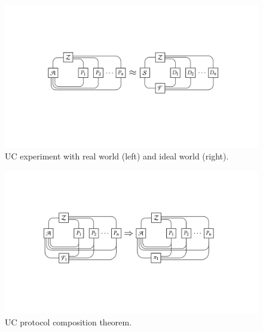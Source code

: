 \begin{figure}
  \centering
  \includegraphics[width=\linewidth]{graphics/uc-experiment}
  \caption{UC experiment with real world (left) and ideal world (right).}
  \label{fig:uc-experiment}
\end{figure}

\begin{figure}
  \centering
  \includegraphics[width=\linewidth]{graphics/composition}
  \caption{UC protocol composition theorem.}
  \label{fig:uc-composition}
\end{figure}
